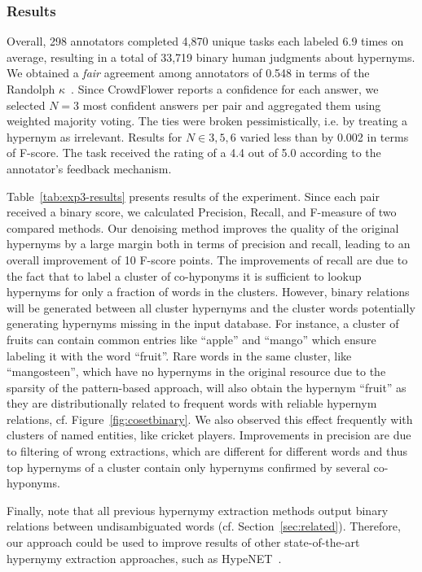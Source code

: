 \documentclass[10pt, a4paper]{article}
\begin{document}
\subsubsection{Results} 

Overall, 298 annotators completed 4,870 unique tasks each labeled 6.9 times on average, resulting in a total of 33,719 binary human judgments about hypernyms. We obtained a \textit{fair} agreement among annotators of 0.548 in terms of the Randolph $\kappa$~\cite{Meyer:14}. Since CrowdFlower reports a confidence for each answer, we selected $N=3$ most confident answers per pair and aggregated them using weighted majority voting. The ties were broken pessimistically, i.e. by treating a hypernym as irrelevant. Results for $N\in{3,5,6}$ varied less than by 0.002 in terms of F-score. The task received the rating of a 4.4 out of 5.0 according to the annotator's feedback mechanism. 

Table~\ref{tab:exp3-results} presents results of the experiment. Since each pair received a binary score, we calculated Precision, Recall, and F-measure of two compared methods. Our denoising method improves the quality of the original hypernyms by a large margin both in terms of precision and recall, leading to an overall improvement of 10  F-score points. The improvements of recall are due to the fact that to label a cluster of co-hyponyms it is sufficient to lookup hypernyms for only a fraction of words in the clusters. However, binary relations will be generated between all cluster hypernyms and the cluster words potentially generating hypernyms missing in the input database. For instance, a cluster of fruits can contain common entries like ``apple'' and ``mango'' which ensure labeling it with the word ``fruit''. Rare words in the same cluster, like ``mangosteen'', which have no hypernyms in the original resource due to the sparsity of the pattern-based approach, will also obtain the hypernym ``fruit'' as they are  distributionally related to frequent words with reliable hypernym relations, cf. Figure~\ref{fig:cosetbinary}. We also observed this effect frequently with clusters of named entities, like cricket players. Improvements in precision are due to filtering of wrong extractions, which are different for different words and thus top hypernyms of a cluster contain only hypernyms confirmed by several co-hyponyms. 

Finally, note that all previous hypernymy extraction methods output binary relations between undisambiguated words (cf. Section~\ref{sec:related}). Therefore, our approach could be used to improve results of other state-of-the-art hypernymy extraction approaches, such as HypeNET~\cite{shwartz-goldberg-dagan:2016:P16-1}.
\end{document}
